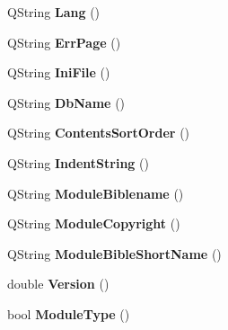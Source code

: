 \begin{DoxyCompactItemize}
\item 
\hypertarget{classConfig_a4f84e0cb299e3bae32639699e0608291}{
QString {\bfseries Lang} ()}
\label{classConfig_a4f84e0cb299e3bae32639699e0608291}

\item 
\hypertarget{classConfig_a1c1795fa09eefa3d03f65dc736ba2e70}{
QString {\bfseries ErrPage} ()}
\label{classConfig_a1c1795fa09eefa3d03f65dc736ba2e70}

\item 
\hypertarget{classConfig_aa68bb878f2b454634c998ec351c296b9}{
QString {\bfseries IniFile} ()}
\label{classConfig_aa68bb878f2b454634c998ec351c296b9}

\item 
\hypertarget{classConfig_ad1784d8a691070c95cb207d13f91d0d0}{
QString {\bfseries DbName} ()}
\label{classConfig_ad1784d8a691070c95cb207d13f91d0d0}

\item 
\hypertarget{classConfig_a8a55bd545f7423b3e49ee67727fa2df5}{
QString {\bfseries ContentsSortOrder} ()}
\label{classConfig_a8a55bd545f7423b3e49ee67727fa2df5}

\item 
\hypertarget{classConfig_aeb0dea31991b81181f421a8c621e2708}{
QString {\bfseries IndentString} ()}
\label{classConfig_aeb0dea31991b81181f421a8c621e2708}

\item 
\hypertarget{classConfig_ab1b2551ec54727800734df5c3e210e45}{
QString {\bfseries ModuleBiblename} ()}
\label{classConfig_ab1b2551ec54727800734df5c3e210e45}

\item 
\hypertarget{classConfig_ab714a80890339910477edf5ed730c92b}{
QString {\bfseries ModuleCopyright} ()}
\label{classConfig_ab714a80890339910477edf5ed730c92b}

\item 
\hypertarget{classConfig_a4d4c411f52407e1989fac1c59c27e1f6}{
QString {\bfseries ModuleBibleShortName} ()}
\label{classConfig_a4d4c411f52407e1989fac1c59c27e1f6}

\item 
\hypertarget{classConfig_ae97a701aa46a7a86d610f0995167d09b}{
double {\bfseries Version} ()}
\label{classConfig_ae97a701aa46a7a86d610f0995167d09b}

\item 
\hypertarget{classConfig_a79d6093ee7fc3d8c1924dcdc5802b73f}{
bool {\bfseries ModuleType} ()}
\label{classConfig_a79d6093ee7fc3d8c1924dcdc5802b73f}


\end{DoxyCompactItemize}
